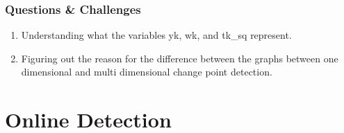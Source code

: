 \documentclass{article}
\begin{document}
\subsubsection{Questions \& Challenges}
\begin{enumerate}
  \item Understanding what the variables yk, wk, and tk\_sq represent.
  \item Figuring out the reason for the difference between the graphs between one dimensional and multi dimensional change point detection.
\end{enumerate}

\section{Online Detection}



\end{document}

